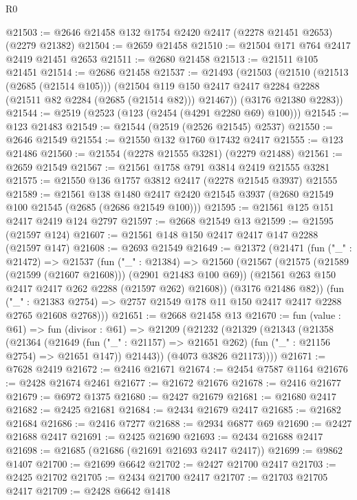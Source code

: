 \begin{lexlean}{R0}
\begin{coremodule}
@21503 := @2646 @21458 @132 @1754 @2420 @2417 (@2278 @21451 @2653) (@2279 @21382)
@21504 := @2659 @21458
@21510 := @21504 @171 @764 @2417 @2419 @21451 @2653
@21511 := @2680 @21458
@21513 := @21511 @105 @21451
@21514 := @2686 @21458
@21537 := @21493
    (@21503
      (@21510
        (@21513 (@2685 (@21514 @105)))
        (@21504 @119 @150 @2417 @2417 @2284 @2288 (@21511 @82 @2284 (@2685 (@21514 @82))) @21467))
      (@3176 @21380 @2283))
@21544 := @2519 (@2523 (@123 (@2454 (@4291 @2280 @69) @100)))
@21545 := @123 @21483
@21549 := @21544 (@2519 (@2526 @21545) @2537)
@21550 := @2646 @21549
@21554 := @21550 @132 @1760 @17432 @2417
@21555 := @123 @21486
@21560 := @21554 (@2278 @21555 @3281) (@2279 @21488)
@21561 := @2659 @21549
@21567 := @21561 @1758 @791 @3814 @2419 @21555 @3281
@21575 := @21550 @136 @1757 @3812 @2417 (@2278 @21545 @3937) @21555
@21589 := @21561
    @138
    @1480
    @2417
    @2420
    @21545
    @3937
    (@2680 @21549 @100 @21545 (@2685 (@2686 @21549 @100)))
@21595 := @21561 @125 @151 @2417 @2419 @124 @2797
@21597 := @2668 @21549 @13
@21599 := @21595 (@21597 @124)
@21607 := @21561 @148 @150 @2417 @2417 @147 @2288 (@21597 @147)
@21608 := @2693 @21549
@21649 := @21372
    (@21471
      (fun ("_" : @21472) =>
      @21537
        (fun ("_" : @21384) =>
        @21560
          (@21567
            (@21575 (@21589 (@21599 (@21607 @21608))) (@2901 @21483 @100 @69))
            (@21561 @263 @150 @2417 @2417 @262 @2288 (@21597 @262) @21608))
          (@3176 @21486 @82))
        (fun ("_" : @21383 @2754) =>
        @2757 @21549 @178 @11 @150 @2417 @2417 @2288 @2765 @21608 @2768)))
@21651 := @2668 @21458 @13
@21670 := fun (value : @61) =>
  fun (divisor : @61) =>
  @21209
    (@21232
      (@21329
        (@21343
          (@21358
            (@21364
              (@21649 (fun ("_" : @21157) => @21651 @262) (fun ("_" : @21156 @2754) => @21651 @147))
              @21443))
          (@4073 @3826 @21173))))
@21671 := @7628 @2419
@21672 := @2416 @21671
@21674 := @2454 @7587 @1164
@21676 := @2428 @21674 @2461
@21677 := @21672 @21676
@21678 := @2416 @21677
@21679 := @6972 @1375
@21680 := @2427 @21679
@21681 := @21680 @2417
@21682 := @2425 @21681
@21684 := @2434 @21679 @2417
@21685 := @21682 @21684
@21686 := @2416 @7277
@21688 := @2934 @6877 @69
@21690 := @2427 @21688 @2417
@21691 := @2425 @21690
@21693 := @2434 @21688 @2417
@21698 := @21685 (@21686 (@21691 @21693 @2417 @2417))
@21699 := @9862 @1407
@21700 := @21699 @6642
@21702 := @2427 @21700 @2417
@21703 := @2425 @21702
@21705 := @2434 @21700 @2417
@21707 := @21703 @21705 @2417
@21709 := @2428 @6642 @1418

\end{coremodule}
\end{lexlean}
